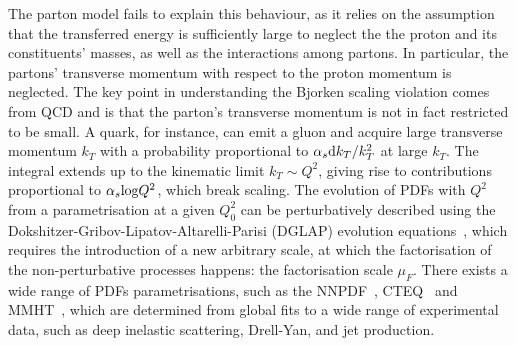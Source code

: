 The parton model fails to explain this behaviour, as it relies on the assumption that the transferred energy is sufficiently large to neglect the the proton and its constituents' masses, as well as the interactions among partons. In particular, the partons' transverse momentum with respect to the proton momentum is neglected. The key point in understanding the Bjorken scaling violation comes from QCD and is that the parton's transverse momentum is not in fact restricted to be small. A quark, for instance, can emit a gluon and acquire large transverse momentum $k_T$ with a probability proportional to $\alpha_s \mathrm{d} k_T/k_T^2$ at large $k_T$. The integral extends up to the kinematic limit $k_T\sim Q^2$, giving rise to contributions proportional to $\alpha_s\mathrm{log}Q^2$, which break scaling. The evolution of PDFs with $Q^2$ from a parametrisation at a given $Q^2_0$ can be perturbatively described using the Dokshitzer-Gribov-Lipatov-Altarelli-Parisi (DGLAP) evolution equations~\cite{Gribov:1972ri,Dokshitzer:1977sg,Altarelli:1977zs}, which requires the introduction of a new arbitrary scale, at which the factorisation of the non-perturbative processes happens: the factorisation scale $\mu_F$. There exists a wide range of PDFs parametrisations, such as the NNPDF~\cite{NNPDF:2021njg}, CTEQ~\cite{Dulat:2015mca} and MMHT~\cite{Harland-Lang:2014zoa}, which are determined from global fits to a wide range of experimental data, such as deep inelastic scattering, Drell-Yan, and jet production.


